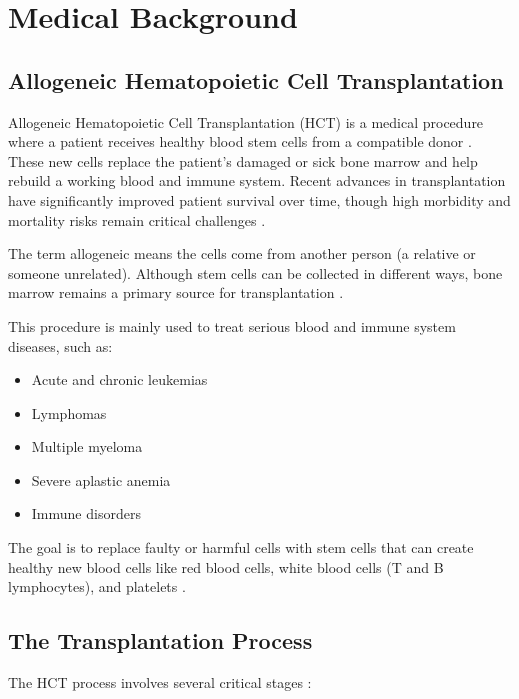 \section{Medical Background}

\subsection{Allogeneic Hematopoietic Cell Transplantation}

Allogeneic Hematopoietic Cell Transplantation (HCT) is a medical procedure where a patient receives healthy blood stem cells from a compatible donor \cite{uptodate_hct}. These new cells replace the patient's damaged or sick bone marrow and help rebuild a working blood and immune system. Recent advances in transplantation have significantly improved patient survival over time, though high morbidity and mortality risks remain critical challenges \cite{astct_simplification}.

The term allogeneic means the cells come from another person (a relative or someone unrelated). Although stem cells can be collected in different ways, bone marrow remains a primary source for transplantation \cite{aacr_historical}.

This procedure is mainly used to treat serious blood and immune system diseases, such as:
\begin{itemize}
    \item Acute and chronic leukemias \cite{ash_transplant_all}
    \item Lymphomas
    \item Multiple myeloma
    \item Severe aplastic anemia
    \item Immune disorders \cite{biorxiv_autoimmune}
\end{itemize}

The goal is to replace faulty or harmful cells with stem cells that can create healthy new blood cells like red blood cells, white blood cells (T and B lymphocytes), and platelets \cite{uptodate_hct}.

\subsection{The Transplantation Process}

The HCT process involves several critical stages \cite{uptodate_hct}:

